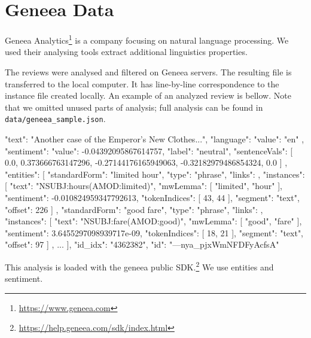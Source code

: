 \chapter{Geneea Data}\label{app:geneea}

Geneea Analytics\footnote{\url{https://www.geneea.com}} is a company focusing on natural language processing.
We used their analysing tools extract additional linguistics properties.

The reviews were analysed and filtered on Geneea servers.
The resulting file is transferred to the local computer.
It has line-by-line correspondence to the instance file created locally.
An example of an analyzed review is bellow.
Note that we omitted unused parts of analysis; full analysis can be found in \texttt{data/geneea\_sample.json}.

\begin{code}
{
  "text": "Another case of the Emperor's New Clothes...",
  "language": {
    "value": "en"
  },
  "sentiment": {
    "value": -0.04392095867614757,
    "label": "neutral",
    "sentenceVals": [
      0.0,
      0.373666763147296,
      -0.27144176165949063,
      -0.32182979486854324,
      0.0
    ]
  },
  "entities": [
    {
      "standardForm": "limited hour",
      "type": "phrase",
      "links": {},
      "instances": [
        {
          "text": "NSUBJ:hours(AMOD:limited)",
          "mwLemma": [
            "limited",
            "hour"
          ],
          "sentiment": -0.010824959347792613,
          "tokenIndices": [
            43,
            44
          ],
          "segment": "text",
          "offset": 226
        }
      ]
    },
    {
      "standardForm": "good fare",
      "type": "phrase",
      "links": {},
      "instances": [
        {
          "text": "NSUBJ:fare(AMOD:good)",
          "mwLemma": [
            "good",
            "fare"
          ],
          "sentiment": 3.6455297098939717e-09,
          "tokenIndices": [
            18,
            21
          ],
          "segment": "text",
          "offset": 97
        }
      ]
    },
	...
  ],
  "id_idx": "4362382",
  "id": "---nya_pjxWmNFDFyAcfsA"
}

\end{code}

This analysis is loaded with the geneea public SDK.\footnote{\url{https://help.geneea.com/sdk/index.html}}
We use entities and sentiment.
